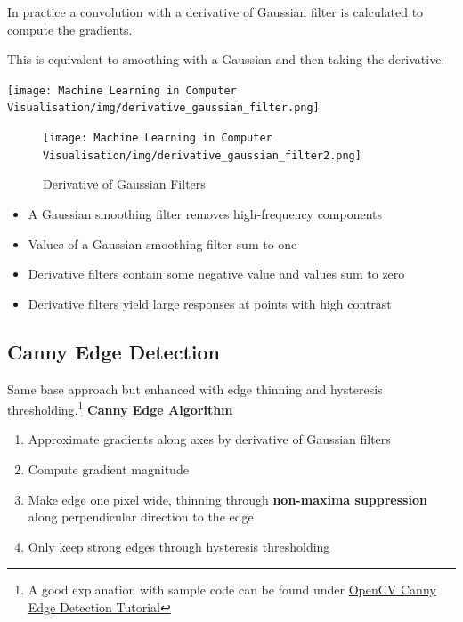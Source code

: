 \documentclass[x11names,11pt,a4paper]{article}
\theoremstyle{definition}
\begin{document}
\noindent
\begin{minipage}{0.6\textwidth}
	In practice a convolution with a derivative of Gaussian filter is calculated to compute the gradients.
	
	This is equivalent to smoothing with a Gaussian and then taking the derivative.
\end{minipage}
\begin{minipage}{0.4\textwidth}
	\begin{center}
		\texttt{[image: Machine Learning in Computer Visualisation/img/derivative\_gaussian\_filter.png]}
	\end{center}
\end{minipage}

\begin{figure}[H]
	\centering
	\texttt{[image: Machine Learning in Computer Visualisation/img/derivative\_gaussian\_filter2.png]}
	\caption{Derivative of Gaussian Filters}
	\label{fig:derivativegaussianfilter2}
\end{figure}

\begin{itemize}
	\item A Gaussian smoothing filter removes high-frequency components
	\item Values of a Gaussian smoothing filter sum to one
	\item Derivative filters contain some negative value and values sum to zero
	\item Derivative filters yield large responses at points with high contrast
\end{itemize}


\subsection{Canny Edge Detection}
Same base approach but enhanced with edge thinning and hysteresis thresholding.\footnote{A good explanation with sample code can be found under \href{https://docs.opencv.org/4.3.0/da/d22/tutorial_py_canny.html}{OpenCV Canny Edge Detection Tutorial}}
\newline
\textbf{Canny Edge Algorithm}
\begin{enumerate}
	\item Approximate gradients along axes by derivative of Gaussian filters
	\item Compute gradient magnitude
	\item Make edge one pixel wide, thinning through \textbf{non-maxima suppression} along perpendicular direction to the edge
	\item Only keep strong edges through hysteresis thresholding 
\end{enumerate}
\end{document}
